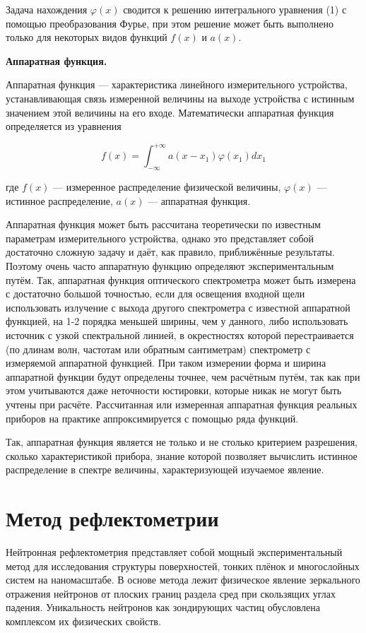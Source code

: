 \documentclass[a4paper]{article}
\begin{document}
Задача нахождения $\varphi \left(x\right)$ сводится к решению интегрального уравнения (1) с помощью преобразования
Фурье, при этом решение может быть выполнено только для некоторых видов функций $f\left(x\right)$ и 
$a\left(x\right)$.

\textbf{Аппаратная функция.}

Аппаратная функция --- характеристика линейного измерительного устройства, устанавливающая связь измеренной величины на выходе устройства с истинным значением этой величины на его входе. Математически аппаратная функция определяется из уравнения

\begin{equation}
f(x) = \int_{-\infty}^{+\infty} a(x-x_1)\varphi(x_1)dx_1
\end{equation}

где $f(x)$ --- измеренное распределение физической величины, $\varphi(x)$ --- истинное распределение, $a(x)$ --- аппаратная функция.

Аппаратная функция может быть рассчитана теоретически по известным параметрам измерительного устройства, однако это
представляет собой достаточно сложную задачу и даёт, как правило, приближённые результаты. Поэтому очень часто
аппаратную функцию определяют экспериментальным путём. Так, аппаратная функция оптического спектрометра может быть
измерена с достаточно большой точностью, если для освещения входной щели использовать излучение с выхода другого
спектрометра с известной аппаратной функцией, на 1-2 порядка меньшей ширины, чем у данного, либо использовать источник
с узкой спектральной линией, в окрестностях которой перестраивается (по длинам волн, частотам или обратным сантиметрам)
спектрометр с измеряемой аппаратной функцией. При таком измерении форма и ширина аппаратной функции будут определены
точнее, чем расчётным путём, так как при этом учитываются даже неточности юстировки, которые никак не могут быть учтены
при расчёте. Рассчитанная или измеренная аппаратная функция реальных приборов на практике аппроксимируется с помощью
ряда функций.

Так, аппаратная функция является не только и не столько критерием разрешения, сколько характеристикой прибора, знание
которой позволяет вычислить истинное распределение в спектре величины, характеризующей изучаемое
явление. 

\section{Метод рефлектометрии}
Нейтронная рефлектометрия представляет собой мощный экспериментальный метод для исследования структуры поверхностей, тонких плёнок и многослойных систем на наномасштабе. В основе метода лежит физическое явление зеркального отражения нейтронов от плоских границ раздела сред при скользящих углах падения.
Уникальность нейтронов как зондирующих частиц обусловлена комплексом их физических свойств. \\
\end{document}
